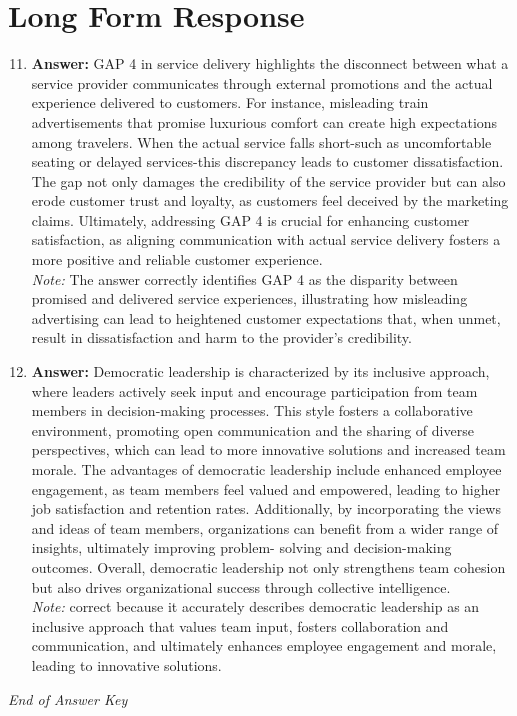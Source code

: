 \documentclass[12pt]{article}
\begin{document}
\section*{Long Form Response}
\begin{enumerate}[label=\arabic*.]
\setcounter{enumi}{10}
\item \textbf{Answer:} GAP 4 in service delivery highlights the disconnect between what a service provider communicates through external promotions and the actual experience delivered to customers. For instance, misleading train advertisements that promise luxurious comfort can create high expectations among travelers. When the actual service falls short-such as uncomfortable seating or delayed services-this discrepancy leads to customer dissatisfaction. The gap not only damages the credibility of the service provider but can also erode customer trust and loyalty, as customers feel deceived by the marketing claims. Ultimately, addressing GAP 4 is crucial for enhancing customer satisfaction, as aligning communication with actual service delivery fosters a more positive and reliable customer experience.
\\ \textit{Note:} The answer correctly identifies GAP 4 as the disparity between promised and delivered service experiences, illustrating how misleading advertising can lead to heightened customer expectations that, when unmet, result in dissatisfaction and harm to the provider's credibility.
\item \textbf{Answer:} Democratic leadership is characterized by its inclusive approach, where leaders actively seek input and encourage participation from team members in decision-making processes. This style fosters a collaborative environment, promoting open communication and the sharing of diverse perspectives, which can lead to more innovative solutions and increased team morale. The advantages of democratic leadership include enhanced employee engagement, as team members feel valued and empowered, leading to higher job satisfaction and retention rates. Additionally, by incorporating the views and ideas of team members, organizations can benefit from a wider range of insights, ultimately improving problem- solving and decision-making outcomes. Overall, democratic leadership not only strengthens team cohesion but also drives organizational success through collective intelligence.
\\ \textit{Note:} correct because it accurately describes democratic leadership as an inclusive approach that values team input, fosters collaboration and communication, and ultimately enhances employee engagement and morale, leading to innovative solutions.
\end{enumerate}

\vfill
\noindent\textit{End of Answer Key}
\end{document}
